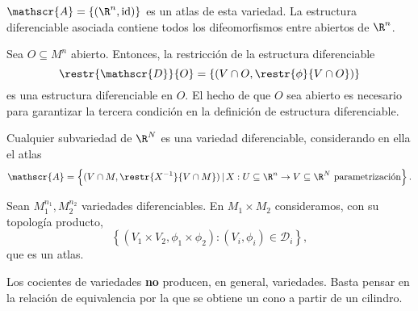 \begin{ejemplo}[$\R^{n}$]
  $\mathscr{A} = \left\{ (\R^{n}, \mathrm{id}) \right\}$ es un atlas de esta
  variedad. La estructura diferenciable asociada contiene todos los
  difeomorfismos entre abiertos de $\R^{n}$.
\end{ejemplo}

\begin{ejemplo}
  Sea $O\subseteq M^{n}$ abierto. Entonces, la restricción de la estructura
  diferenciable
  \[
    \restr{\mathscr{D}}{O} = \left\{ (V\cap O, \restr{\phi}{V\cap O}) \right\}
  \]
  es una estructura diferenciable en $O$. El hecho de que $O$ sea abierto es
  necesario para garantizar la tercera condición en la definición de estructura diferenciable.
\end{ejemplo}

\begin{ejemplo}[Subvariedades]
  Cualquier subvariedad de $\R^{N}$ es una variedad diferenciable, considerando en
  ella el atlas
  \[
    \mathscr{A} = \left\{ (V\cap M, \restr{X^{-1}}{V\cap M})\, | \, X: U\subseteq
      \R^{n}\to V\subseteq\R^{N} \text{ parametrización} \right\}
  .\]
\end{ejemplo}

\begin{ejemplo}
  Sean $M_{1}^{n_{1}}, M_{2}^{n_{2}}$ variedades diferenciables. En $M_{1}\times
  M_{2}$ consideramos, con su topología producto,
  \[
    \left\{ (V_{1}\times V_{2}, \phi_{1}\times\phi_{2}) : (V_{i}, \phi_{i})\in \mathscr{D}_{i} \right\}
  ,\]
que es un atlas.
\end{ejemplo}

\begin{ejemplo}[Cocientes]
  Los cocientes de variedades \textbf{no} producen, en general,
  variedades. Basta pensar en la relación de equivalencia por la que se obtiene
  un cono a partir de un cilindro.
\end{ejemplo}

